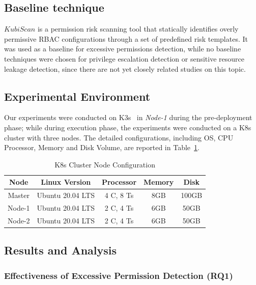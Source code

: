 \documentclass[conference]{IEEEtran}
\theoremstyle{definition}
\begin{document}
\subsection{Baseline technique}
$KubiScan$ is a permission risk scanning tool that statically identifies overly permissive RBAC configurations through a set of predefined risk templates. It was used as a baseline for excessive permissions detection, while no baseline techniques were chosen for privilege escalation detection or sensitive resource leakage detection, since there are not yet  closely related studies on this topic. 

\subsection{Experimental Environment} 

Our experiments were conducted on K3s~\cite{k3sdocs} in \textit{Node-1} during the pre-deployment phase; while during execution phase, the experiments were conducted on a K8s cluster with three nodes. The detailed configurations, including OS, CPU Processor, Memory and Disk Volume, are reported in Table~\ref{tab:k8s_nodes}.

\vspace{-6pt}
\begin{table}[!htb]
    \centering
    \caption{K8s Cluster Node Configuration}
    \renewcommand{\arraystretch}{1.5} 
    \begin{tabular}{ccccc}
        \hline
        \textbf{Node} & \textbf{Linux Version} & \textbf{Processor} & \textbf{Memory} & \textbf{Disk} \\
        \hline
        Master   & Ubuntu 20.04 LTS & 4 C, 8 Ts   & 8GB   & 100GB \\
        Node-1   & Ubuntu 20.04 LTS & 2 C, 4 Ts   & 6GB   & 50GB  \\
        Node-2   & Ubuntu 20.04 LTS & 2 C, 4 Ts   & 6GB   & 50GB  \\
        \hline
    \end{tabular}
    \label{tab:k8s_nodes}
\end{table}
\vspace{-6pt}

\subsection{Results and Analysis} 
\label{sec:exp_results}

\subsubsection{Effectiveness of Excessive Permission Detection (RQ1)} 
\label{sec:exp_results}
\end{document}
